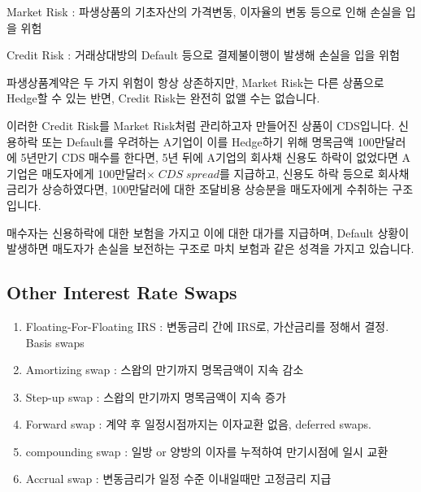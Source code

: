 \documentclass[
  letterpaper,
  DIV=11,
  numbers=noendperiod]{scrreprt}
\providecommand{\tightlist}{%
  \setlength{\itemsep}{0pt}\setlength{\parskip}{0pt}}\usepackage{longtable,booktabs,array}
\begin{document}
\begin{tcolorbox}[enhanced jigsaw, toprule=.15mm, breakable, left=2mm, leftrule=.75mm, opacitybacktitle=0.6, coltitle=black, rightrule=.15mm, colback=white, titlerule=0mm, bottomtitle=1mm, colframe=quarto-callout-caution-color-frame, title=\textcolor{quarto-callout-caution-color}{\faFire}\hspace{0.5em}{Market Risk vs.~Credit Risk}, toptitle=1mm, arc=.35mm, colbacktitle=quarto-callout-caution-color!10!white, opacityback=0, bottomrule=.15mm]

Market Risk : 파생상품의 기초자산의 가격변동, 이자율의 변동 등으로 인해
손실을 입을 위험

Credit Risk : 거래상대방의 Default 등으로 결제불이행이 발생해 손실을
입을 위험

파생상품계약은 두 가지 위험이 항상 상존하지만, Market Risk는 다른
상품으로 Hedge할 수 있는 반면, Credit Risk는 완전히 없앨 수는 없습니다.

\end{tcolorbox}

이러한 Credit Risk를 Market Risk처럼 관리하고자 만들어진 상품이
CDS입니다. 신용하락 또는 Default를 우려하는 A기업이 이를 Hedge하기 위해
명목금액 100만달러에 5년만기 CDS 매수를 한다면, 5년 뒤에 A기업의 회사채
신용도 하락이 없었다면 A기업은 매도자에게
100만달러\(\times\;CDS\;spread\)를 지급하고, 신용도 하락 등으로 회사채
금리가 상승하였다면, 100만달러에 대한 조달비용 상승분을 매도자에게
수취하는 구조입니다.

매수자는 신용하락에 대한 보험을 가지고 이에 대한 대가를 지급하며,
Default 상황이 발생하면 매도자가 손실을 보전하는 구조로 마치 보험과 같은
성격을 가지고 있습니다.

\subsection*{Other Interest Rate Swaps}\label{other-interest-rate-swaps}

\begin{enumerate}
\def\labelenumi{(\arabic{enumi})}
\tightlist
\item
  Floating-For-Floating IRS : 변동금리 간에 IRS로, 가산금리를 정해서
  결정. Basis swaps
\item
  Amortizing swap : 스왑의 만기까지 명목금액이 지속 감소
\item
  Step-up swap : 스왑의 만기까지 명목금액이 지속 증가
\item
  Forward swap : 계약 후 일정시점까지는 이자교환 없음, deferred swaps.
\item
  compounding swap : 일방 or 양방의 이자를 누적하여 만기시점에 일시 교환
\item
  Accrual swap : 변동금리가 일정 수준 이내일때만 고정금리 지급
\end{enumerate}
\end{document}
